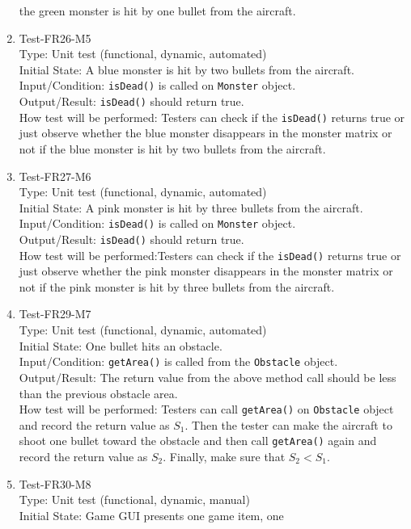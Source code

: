 \documentclass[12pt]{article}
\begin{document}
\begin{enumerate}[1.]
 the green monster is hit by one bullet from the aircraft.
\item Test-FR26-M5\\
Type: Unit test (functional, dynamic, automated)\\
Initial State: A blue monster is hit by two bullets 
from the aircraft.\\
Input/Condition: \verb|isDead()| is called on \verb|Monster| object.\\
Output/Result: \verb|isDead()| should return true.\\
How test will be performed: Testers can check if the \verb|isDead()| returns true or just observe whether the blue monster disappears in the monster matrix or not if
 the blue monster is hit by two bullets from the aircraft.
\item Test-FR27-M6\\
Type: Unit test (functional, dynamic, automated)\\
Initial State: A pink monster is hit by three bullets 
from the aircraft.\\
Input/Condition: \verb|isDead()| is called on \verb|Monster| object.\\
Output/Result: \verb|isDead()| should return true.\\
How test will be performed:Testers can check if the
\verb|isDead()| returns true or just observe whether the 
pink monster disappears in the monster matrix or not if
the pink monster is hit by three bullets from the
aircraft.
\item Test-FR29-M7\\
Type: Unit test (functional, dynamic, automated)\\
Initial State: One bullet hits an obstacle.\\
Input/Condition: \verb|getArea()| is called from the \verb|Obstacle| object.\\
Output/Result: The return value from the above method call should be less than the previous obstacle area.\\ 
How test will be performed: Testers can call \verb|getArea()| on \verb|Obstacle| object and record the return value as $S_1$. Then the tester can make the aircraft to shoot one bullet toward the obstacle and then call \verb|getArea()| again and record the return value as $S_2$. Finally, make sure that $S_2 < S_1$.
\item Test-FR30-M8\\
Type: Unit test (functional, dynamic, manual)\\
Initial State: Game GUI presents one game item, one 

\end{enumerate}
\end{document}
